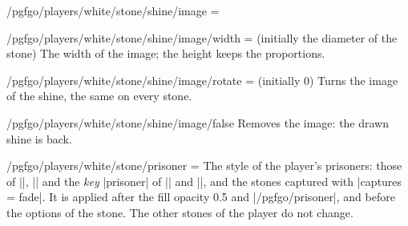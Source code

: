 \begin{goban}[9, stone = {radius = 4pt}, mark = {line = {color = red}}]
\begin{key}{/pgfgo/players/white/stone/shine/image = }
\begin{codeexample}[width=4cm]
		\begin{goban}[5, partial = B2:D4]
		\end{goban}
	\end{codeexample}
\end{key}


\begin{key}{/pgfgo/players/white/stone/shine/image/width =  (initially the diameter of the stone)}
	The width of the image; the height keeps the proportions.
\end{key}

\begin{key}{/pgfgo/players/white/stone/shine/image/rotate =  (initially 0)}
	Turns the image of the shine, the same on every stone.

	\begin{codeexample}[width=4cm]

		\begin{goban}[5, partial = B2:D4]
		\end{goban}
	\end{codeexample}
\end{key}

\begin{stylekey}{/pgfgo/players/white/stone/shine/image/false}
	Removes the image: the drawn shine is back.
\end{stylekey}

\begin{key}{/pgfgo/players/white/stone/prisoner = }
	The style of the player's prisoners: those of |\prisoner|, |\prisoners| and the \emph{key} |prisoner| of |\stone| and |\stones|, and the stones captured with |captures = fade|. It is applied after the fill opacity 0.5 and |/pgfgo/prisoner|, and before the options of the stone. The other stones of the player do not change.

	\begin{codeexample}[]


\end{codeexample}
\end{key}
\end{goban}
